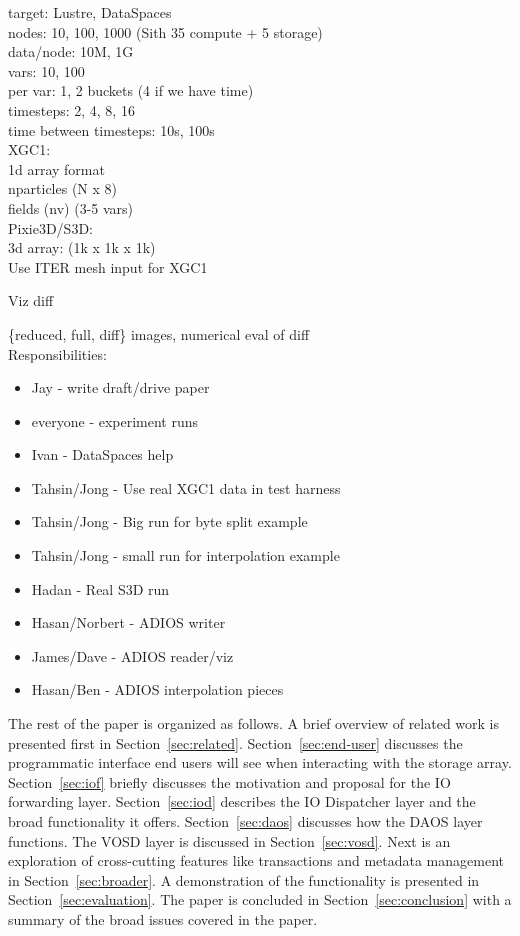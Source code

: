 \documentclass{sig-alt-gov2}
\begin{document}
target: Lustre, DataSpaces\\
nodes: 10, 100, 1000 (Sith 35 compute + 5 storage)\\
data/node: 10M, 1G\\
vars: 10, 100\\
per var: 1, 2 buckets (4 if we have time)\\
timesteps: 2, 4, 8, 16\\
time between timesteps: 10s, 100s\\

XGC1:\\
1d array format\\
nparticles (N x 8)\\
fields (nv) (3-5 vars)\\

Pixie3D/S3D:\\
3d array: (1k x 1k x 1k)\\

Use ITER mesh input for XGC1

Viz diff

\{reduced, full, diff\} images, numerical eval of diff\\

Responsibilities:
\begin{itemize}
\item Jay - write draft/drive paper
\item everyone - experiment runs
\item Ivan - DataSpaces help
\item Tahsin/Jong - Use real XGC1 data in test harness
\item Tahsin/Jong - Big run for byte split example
\item Tahsin/Jong - small run for interpolation example
\item Hadan - Real S3D run
\item Hasan/Norbert - ADIOS writer
\item James/Dave - ADIOS reader/viz
\item Hasan/Ben - ADIOS interpolation pieces
\end{itemize}


The rest of the paper is organized as follows. A brief overview of related work
is presented first in Section~\ref{sec:related}. Section~\ref{sec:end-user}
discusses the programmatic interface end users will see when interacting with
the storage array.
Section~\ref{sec:iof}
briefly discusses the motivation and proposal for the IO forwarding layer.
Section~\ref{sec:iod} describes the IO Dispatcher layer and the broad
functionality it offers.
Section~\ref{sec:daos} discusses how the DAOS
layer functions.
The VOSD layer is discussed in Section~\ref{sec:vosd}.
Next is an exploration of cross-cutting features like transactions and
metadata management in Section~\ref{sec:broader}.
A demonstration of the functionality is presented in
Section~\ref{sec:evaluation}.
The paper is concluded in
Section~\ref{sec:conclusion} with a summary of the broad issues covered in the
paper.
\end{document}
